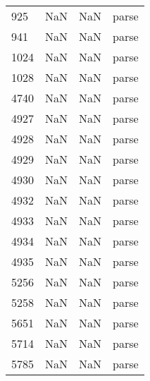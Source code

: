 \begin{tabular}{llll}
925  &                   NaN &                        NaN &                                     parse \\
941  &                   NaN &                        NaN &                                     parse \\
1024 &                   NaN &                        NaN &                                     parse \\
1028 &                   NaN &                        NaN &                                     parse \\
4740 &                   NaN &                        NaN &                                     parse \\
4927 &                   NaN &                        NaN &                                     parse \\
4928 &                   NaN &                        NaN &                                     parse \\
4929 &                   NaN &                        NaN &                                     parse \\
4930 &                   NaN &                        NaN &                                     parse \\
4932 &                   NaN &                        NaN &                                     parse \\
4933 &                   NaN &                        NaN &                                     parse \\
4934 &                   NaN &                        NaN &                                     parse \\
4935 &                   NaN &                        NaN &                                     parse \\
5256 &                   NaN &                        NaN &                                     parse \\
5258 &                   NaN &                        NaN &                                     parse \\
5651 &                   NaN &                        NaN &                                     parse \\
5714 &                   NaN &                        NaN &                                     parse \\
5785 &                   NaN &                        NaN &                                     parse \\

\end{tabular}
